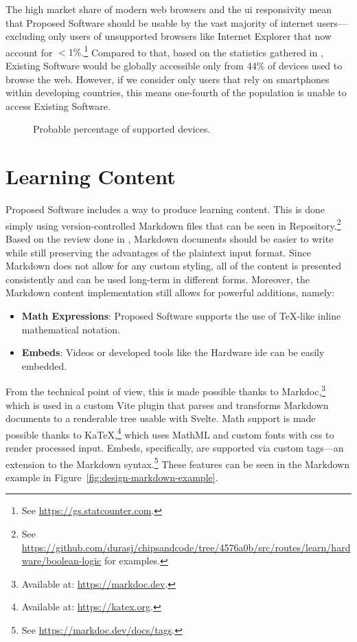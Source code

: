 The high market share of modern web browsers and the \gls{ui} responsivity mean that Proposed Software should be usable by the vast majority of internet users---excluding only users of unsupported browsers like Internet Explorer that now account for $<1\%$.\footnote{See \url{https://gs.statcounter.com}.}
Compared to that, based on the statistics gathered in , Existing Software would be globally accessible only from 44\% of devices used to browse the web.
However, if we consider only users that rely on smartphones within developing countries, this means one-fourth of the population is unable to access Existing Software.

\begin{figure}[H]
    \centering
    
    \caption{Probable percentage of supported devices.}
    \label{fig:design-device-support}
\end{figure}

\section{Learning Content}

Proposed Software includes a way to produce learning content.
This is done simply using version-controlled Markdown files that can be seen in Repository.\footnote{See \url{https://github.com/durasj/chipsandcode/tree/4576a0b/src/routes/learn/hardware/boolean-logic} for examples.}
Based on the review done in , Markdown documents should be easier to write while still preserving the advantages of the plaintext input format.
Since Markdown does not allow for any custom styling, all of the content is presented consistently and can be used long-term in different forms.
Moreover, the Markdown content implementation still allows for powerful additions, namely:

\begin{itemize}
    \item \textbf{Math Expressions}: Proposed Software supports the use of TeX-like inline mathematical notation.
    \item \textbf{Embeds}: Videos or developed tools like the Hardware \gls{ide} can be easily embedded.
\end{itemize}

From the technical point of view, this is made possible thanks to Markdoc,\footnote{Available at: \url{https://markdoc.dev}.} which is used in a custom Vite plugin that parses and transforms Markdown documents to a renderable tree usable with Svelte.
Math support is made possible thanks to KaTeX,\footnote{Available at: \url{https://katex.org}.} which uses MathML and custom fonts with \gls{css} to render processed input.
Embeds, specifically, are supported via custom tags---an extension to the Markdown syntax.\footnote{See \url{https://markdoc.dev/docs/tags}.}
These features can be seen in the Markdown example in Figure~\ref{fig:design-markdown-example}.

